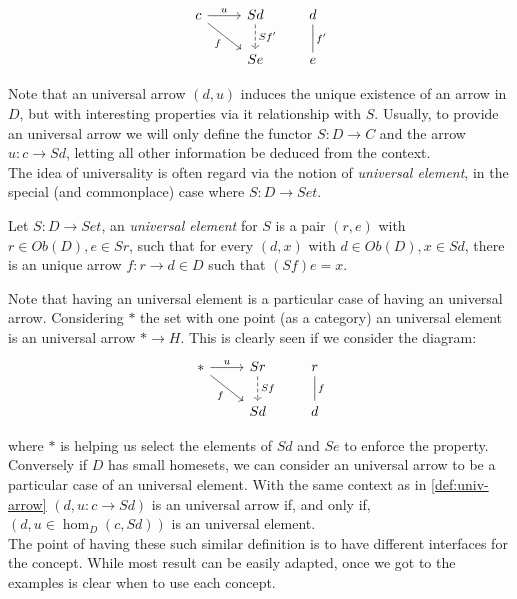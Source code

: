 \[
  \begin{tikzcd}
    c\arrow[r, "u"] \arrow[rd, "f", swap]      & Sd \arrow[d, "Sf'", dashed]& d\arrow[d,"f'",dash]\\
    &Se& e 
  \end{tikzcd}
\]

Note that an universal arrow $(d,u)$ induces the unique existence of an arrow in $D$, but with interesting properties via it relationship with $S$. Usually, to provide an universal arrow we will only define the functor $S:D\to C$ and the arrow $u:c\to Sd$, letting all other information be deduced from the context.\\



The idea of universality is often regard via the notion of \emph{universal element}, in the special (and commonplace) case where $S:D\to Set$.

\begin{definition}
  Let $S: D \to Set$, an \emph{universal element}  for $S$ is a pair $(r,e)$ with $r \in Ob(D), e \in   Sr$, such that for every $(d,x)$ with $d\in Ob(D), x\in Sd$, there is an unique arrow $f:r\to d\in D$ such that $(Sf)e = x$. 
\end{definition}


Note that having an universal element is a particular case of having an universal arrow. Considering $*$ the set with one point (as a category) an universal element is an universal arrow $*\to H$. This is clearly seen if we consider the diagram:
\[
  \begin{tikzcd}
    *\arrow[r, "u"] \arrow[rd, "f", swap] & Sr \arrow[d, "Sf", dashed]& r\arrow[d,"f", dash]\\
    &Sd& d 
  \end{tikzcd}
\]

where $*$ is helping us select the elements of $Sd$ and $Se$ to enforce the property.\\

Conversely if $D$ has small homesets, we can consider an universal arrow to be a particular case of an universal element. With the same context as in \ref{def:univ-arrow} $(d,u: c\to Sd)$ is an universal arrow if, and only if, $(d, u\in  \hom_{D}(c, Sd))$ is an universal element.\\

The point of having these such similar definition is to have different interfaces for the concept. While most result can be easily adapted, once we got to the examples is clear when to use each concept. 

